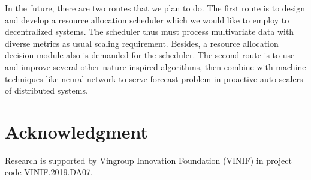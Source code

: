 \documentclass[11pt,twoside]{article}
\def\labart{yourLabel}      %
\begin{document}
\begin{multicols}{2}
In the future, there are two routes that we plan to do. The first route is to design and develop a resource allocation scheduler which we would like to employ to decentralized systems. The scheduler thus must process multivariate data with diverse metrics as usual scaling requirement. Besides, a resource allocation decision module also is demanded for the scheduler. The second route is to use and improve several other nature-inspired algorithms, then combine with machine techniques like neural network to serve forecast problem in proactive auto-scalers of distributed systems.

\section*{Acknowledgment} 
Research is supported by Vingroup Innovation Foundation (VINIF) in project code VINIF.2019.DA07.



%

%






% 
% 


\label{\labart-LastPage}

\end{multicols}
\end{document}
